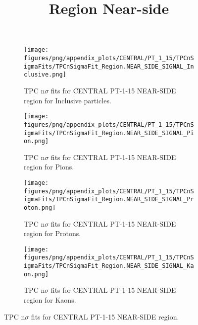             \begin{figure}[H]
                \title{Region Near-side}
                \begin{subfigure}[b]{0.5\textwidth}
                    \centering
                    \texttt{[image: figures/png/appendix\_plots/CENTRAL/PT\_1\_15/TPCnSigmaFits/TPCnSigmaFit\_Region.NEAR\_SIDE\_SIGNAL\_Inclusive.png]}
                    \caption{TPC n$\sigma$ fits for CENTRAL PT-1-15 NEAR-SIDE region for Inclusive particles.}
                    \label{fig:appendix_CENTRAL_PT-1-15_NEAR_SIDE_SIGNAL_Inclusive}
                \end{subfigure}
                \begin{subfigure}[b]{0.5\textwidth}
                    \centering
                    \texttt{[image: figures/png/appendix\_plots/CENTRAL/PT\_1\_15/TPCnSigmaFits/TPCnSigmaFit\_Region.NEAR\_SIDE\_SIGNAL\_Pion.png]}
                    \caption{TPC n$\sigma$ fits for CENTRAL PT-1-15 NEAR-SIDE region for Pions.}
                    \label{fig:appendix_CENTRAL_PT-1-15_NEAR_SIDE_SIGNAL_Pion}
                \end{subfigure}
                \begin{subfigure}[b]{0.5\textwidth}
                    \centering
                    \texttt{[image: figures/png/appendix\_plots/CENTRAL/PT\_1\_15/TPCnSigmaFits/TPCnSigmaFit\_Region.NEAR\_SIDE\_SIGNAL\_Proton.png]}
                    \caption{TPC n$\sigma$ fits for CENTRAL PT-1-15 NEAR-SIDE region for Protons.}
                    \label{fig:appendix_CENTRAL_PT-1-15_NEAR_SIDE_SIGNAL_Proton}
                \end{subfigure}
                \begin{subfigure}[b]{0.5\textwidth}
                    \centering
                    \texttt{[image: figures/png/appendix\_plots/CENTRAL/PT\_1\_15/TPCnSigmaFits/TPCnSigmaFit\_Region.NEAR\_SIDE\_SIGNAL\_Kaon.png]}
                    \caption{TPC n$\sigma$ fits for CENTRAL PT-1-15 NEAR-SIDE region for Kaons.}
                    \label{fig:appendix_CENTRAL_PT-1-15_NEAR_SIDE_SIGNAL_Kaon}
                \end{subfigure}
                \caption{TPC n$\sigma$ fits for CENTRAL PT-1-15 NEAR-SIDE region.}
                \label{fig:appendix_CENTRAL_PT-1-15_NEAR_SIDE_SIGNAL}
            \end{figure}
